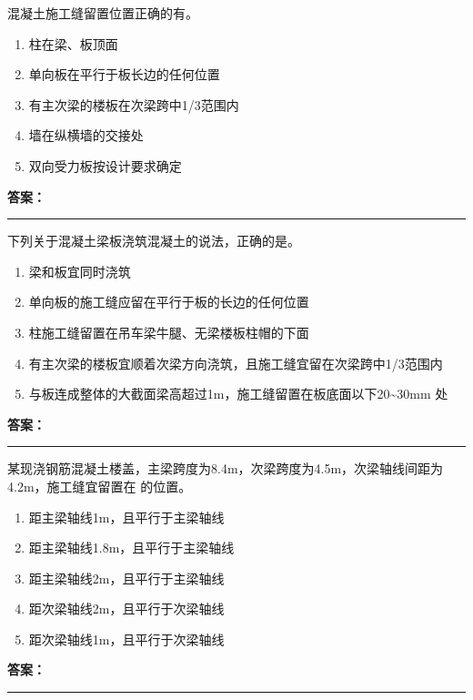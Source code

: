 \documentclass[UTF8,fontset=fandol,11pt]{ctexart}
\newcommand{\answerline}{\textcolor{answerred}{\rule{2.4cm}{0.7pt}}}
\begin{document}
\vspace{0.2em}

\begin{quizbox}[title={第 75 题}]
混凝土施工缝留置位置正确的有。\\
\begin{enumerate}[label=\Alph*.]
\item 柱在梁、板顶面
\item 单向板在平行于板长边的任何位置
\item 有主次梁的楼板在次梁跨中1/3范围内
\item 墙在纵横墙的交接处
\item 双向受力板按设计要求确定
\end{enumerate}
\textbf{\textcolor{answerred}{答案：}} \answerline
\end{quizbox}

\vspace{0.2em}

\begin{quizbox}[title={第 76 题}]
下列关于混凝土梁板浇筑混凝土的说法，正确的是。\\
\begin{enumerate}[label=\Alph*.]
\item 梁和板宜同时浇筑
\item 单向板的施工缝应留在平行于板的长边的任何位置
\item 柱施工缝留置在吊车梁牛腿、无梁楼板柱帽的下面
\item 有主次梁的楼板宜顺着次梁方向浇筑，且施工缝宜留在次梁跨中1/3范围内
\item 与板连成整体的大截面梁高超过1m，施工缝留置在板底面以下20\textasciitilde{}30mm 处
\end{enumerate}
\textbf{\textcolor{answerred}{答案：}} \answerline
\end{quizbox}

\vspace{0.2em}

\begin{quizbox}[title={第 77 题}]
某现浇钢筋混凝土楼盖，主梁跨度为8.4m，次梁跨度为4.5m，次梁轴线间距为4.2m，施工缝宜留置在 的位置。\\
\begin{enumerate}[label=\Alph*.]
\item 距主梁轴线1m，且平行于主梁轴线
\item 距主梁轴线1.8m，且平行于主梁轴线
\item 距主梁轴线2m，且平行于主梁轴线
\item 距次梁轴线2m，且平行于次梁轴线
\item 距次梁轴线1m，且平行于次梁轴线
\end{enumerate}
\textbf{\textcolor{answerred}{答案：}} \answerline
\end{quizbox}
\end{document}
